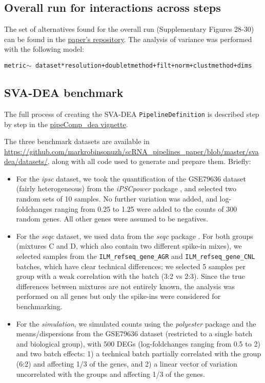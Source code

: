 \documentclass{bmcart}
\begin{document}
{\color{red}\subsection*{Overall run for interactions across steps}

The set of alternatives found for the overall run (Supplementary Figures 28-30) can be found in the \href{https://github.com/markrobinsonuzh/scRNA_pipelines_paper/blob/master/data/overall_run.Rmd}{paper's repository}. The analysis of variance was performed with the following model:

\texttt{metric$\sim$ dataset*resolution+doubletmethod+filt+norm+clustmethod+dims}

\subsection*{SVA-DEA benchmark}

The full process of creating the SVA-DEA \texttt{PipelineDefinition} is described step by step in the \href{https://github.com/plger/pipeComp/blob/master/vignettes/pipeComp_dea.Rmd}{pipeComp\_dea vignette}.

The three benchmark datasets are available in \url{https://github.com/markrobinsonuzh/scRNA\_pipelines\_paper/blob/master/svadea/datasets/}, along with all code used to generate and prepare them. Briefly:
\begin{itemize}
    \item For the \textit{ipsc} dataset, we took the quantification of the GSE79636 dataset (fairly heterogeneous) from the \textit{iPSCpower} package \citep{germainTamingHumanGenetic2017}, and selected two random sets of 10 samples. No further variation was added, and log-foldchanges ranging from 0.25 to 1.25 were added to the counts of 300 random genes. All other genes were assumed to be negatives.
    \item For the \textit{seqc} dataset, we used data from the \textit{seqc} package \citep{ComprehensiveAssessment2014}. For both groups (mixtures C and D, which also contain two different spike-in mixes), we selected samples from the \texttt{ILM\_refseq\_gene\_AGR} and \texttt{ILM\_refseq\_gene\_CNL} batches, which have clear technical differences; we selected 5 samples per group with a weak correlation with the batch (3:2 vs 2:3). Since the true differences between mixtures are not entirely known, the analysis was performed on all genes but only the spike-ins were considered for benchmarking.
    \item For the \textit{simulation}, we simulated counts using the \textit{polyester} package \citep{frazeePolyesterSimulating2015} and the means/dispersions from the GSE79636 dataset (restricted to a single batch and biological group), with 500 DEGs (log-foldchanges ranging from 0.5 to 2) and two batch effects: 1) a technical batch partially correlated with the group (6:2) and affecting 1/3 of the genes, and 2) a linear vector of variation uncorrelated with the groups and affecting 1/3 of the genes.
\end{itemize}

}
\end{document}

